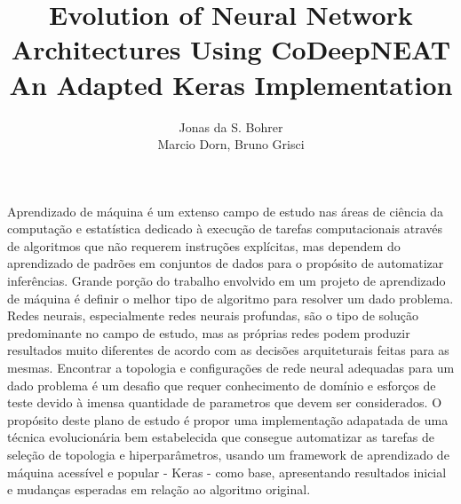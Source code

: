 \documentclass[12pt]{article}
\title{Evolution of Neural Network Architectures Using CoDeepNEAT \\ An Adapted Keras Implementation}
\author{Jonas da S. Bohrer\inst{1}\\ Marcio Dorn, Bruno Grisci}
\begin{document}
 

\maketitle
     
\begin{resumo} 
    \begin{comment}
      Este relatório descreve os tópicos relevantes, o processo de estudo e o planejamento de tarefas para a finalização do trabalho de conclusão do curso de Engenharia de Computação na Universidade Federal do Rio Grande do Sul. Nele é estabelecida a base teórica do projeto acompanhada de referências bibliográficas dos tópicos referentes à pesquisa realizada. A descrição conta com uma breve introdução sobre os estudos de neuroevolução, ou seja, o desenvolvimento e aprimoramento de redes neurais através de algoritmos evolutivos. Neste contexto, o estudo é direcionado especialmente à evolução de topologias de redes neurais. Além disso, são apresentados os experimentos realizados no tópico e futuras atividades planejadas. Pelo fato de o material fonte se encontrar majoritariamente em inglês, o conteúdo do relatório é apresentado da mesma forma.
    \end{comment}
    
  Aprendizado de máquina é um extenso campo de estudo nas áreas de ciência da computação e estatística dedicado à execução de tarefas computacionais através de algoritmos que não requerem instruções explícitas, mas dependem do aprendizado de padrões em conjuntos de dados para o propósito de automatizar inferências. Grande porção do trabalho envolvido em um projeto de aprendizado de máquina é definir o melhor tipo de algoritmo para resolver um dado problema. Redes neurais, especialmente redes neurais profundas, são o tipo de solução predominante no campo de estudo, mas as próprias redes podem produzir resultados muito diferentes de acordo com as decisões arquiteturais feitas para as mesmas. Encontrar a topologia e configurações de rede neural adequadas para um dado problema é um desafio que requer conhecimento de domínio e esforços de teste devido à imensa quantidade de parametros que devem ser considerados. O propósito deste plano de estudo é propor uma implementação adapatada de uma técnica evolucionária bem estabelecida que consegue automatizar as tarefas de seleção de topologia e hiperparâmetros, usando um framework de aprendizado de máquina acessível e popular - Keras - como base, apresentando resultados inicial e mudanças esperadas em relação ao algoritmo original.
    

\end{resumo}
\end{document}
